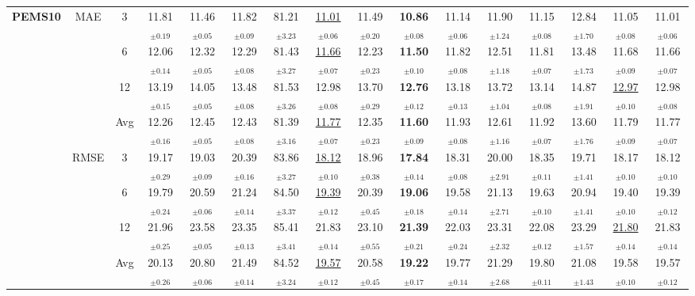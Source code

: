 \begin{table}[t]
{\begin{tabular}{ccc|ccc|cccc|cccc|cc}
\midrule
\multirow{12}{*}{\textbf{PEMS10}} & \multirow{4}{*}{MAE} & 3 & 11.81$_{\pm0.19}$ & 11.46$_{\pm0.05}$ & 11.82$_{\pm0.09}$ & 81.21$_{\pm3.23}$ & \underline{11.01$_{\pm0.06}$} & 11.49$_{\pm0.20}$ & \textbf{10.86$_{\pm0.08}$} & 11.14$_{\pm0.06}$ & 11.90$_{\pm1.24}$ & 11.15$_{\pm0.08}$ & 12.84$_{\pm1.70}$ & 11.05$_{\pm0.08}$ & 11.01$_{\pm0.06}$ \\
 &  & 6 & 12.06$_{\pm0.14}$ & 12.32$_{\pm0.05}$ & 12.29$_{\pm0.08}$ & 81.43$_{\pm3.27}$ & \underline{11.66$_{\pm0.07}$} & 12.23$_{\pm0.23}$ & \textbf{11.50$_{\pm0.10}$} & 11.82$_{\pm0.08}$ & 12.51$_{\pm1.18}$ & 11.81$_{\pm0.07}$ & 13.48$_{\pm1.73}$ & 11.68$_{\pm0.09}$ & 11.66$_{\pm0.07}$ \\
 &  & 12 & 13.19$_{\pm0.15}$ & 14.05$_{\pm0.05}$ & 13.48$_{\pm0.08}$ & 81.53$_{\pm3.26}$ & 12.98$_{\pm0.08}$ & 13.70$_{\pm0.29}$ & \textbf{12.76$_{\pm0.12}$} & 13.18$_{\pm0.13}$ & 13.72$_{\pm1.04}$ & 13.14$_{\pm0.08}$ & 14.87$_{\pm1.91}$ & \underline{12.97$_{\pm0.10}$} & 12.98$_{\pm0.08}$ \\
 &  & Avg & 12.26$_{\pm0.16}$ & 12.45$_{\pm0.05}$ & 12.43$_{\pm0.08}$ & 81.39$_{\pm3.16}$ & \underline{11.77$_{\pm0.07}$} & 12.35$_{\pm0.23}$ & \textbf{11.60$_{\pm0.09}$} & 11.93$_{\pm0.08}$ & 12.61$_{\pm1.16}$ & 11.92$_{\pm0.07}$ & 13.60$_{\pm1.76}$ & 11.79$_{\pm0.09}$ & 11.77$_{\pm0.07}$ \\
\cmidrule(lr){2-16}
 & \multirow{4}{*}{RMSE} & 3 & 19.17$_{\pm0.29}$ & 19.03$_{\pm0.09}$ & 20.39$_{\pm0.16}$ & 83.86$_{\pm3.27}$ & \underline{18.12$_{\pm0.10}$} & 18.96$_{\pm0.38}$ & \textbf{17.84$_{\pm0.14}$} & 18.31$_{\pm0.08}$ & 20.00$_{\pm2.91}$ & 18.35$_{\pm0.11}$ & 19.71$_{\pm1.41}$ & 18.17$_{\pm0.10}$ & 18.12$_{\pm0.10}$ \\
 &  & 6 & 19.79$_{\pm0.24}$ & 20.59$_{\pm0.06}$ & 21.24$_{\pm0.14}$ & 84.50$_{\pm3.37}$ & \underline{19.39$_{\pm0.12}$} & 20.39$_{\pm0.45}$ & \textbf{19.06$_{\pm0.18}$} & 19.58$_{\pm0.14}$ & 21.13$_{\pm2.71}$ & 19.63$_{\pm0.10}$ & 20.94$_{\pm1.41}$ & 19.40$_{\pm0.10}$ & 19.39$_{\pm0.12}$ \\
 &  & 12 & 21.96$_{\pm0.25}$ & 23.58$_{\pm0.05}$ & 23.35$_{\pm0.13}$ & 85.41$_{\pm3.41}$ & 21.83$_{\pm0.14}$ & 23.10$_{\pm0.55}$ & \textbf{21.39$_{\pm0.21}$} & 22.03$_{\pm0.24}$ & 23.31$_{\pm2.32}$ & 22.08$_{\pm0.12}$ & 23.29$_{\pm1.57}$ & \underline{21.80$_{\pm0.14}$} & 21.83$_{\pm0.14}$ \\
 &  & Avg & 20.13$_{\pm0.26}$ & 20.80$_{\pm0.06}$ & 21.49$_{\pm0.14}$ & 84.52$_{\pm3.24}$ & \underline{19.57$_{\pm0.12}$} & 20.58$_{\pm0.45}$ & \textbf{19.22$_{\pm0.17}$} & 19.77$_{\pm0.14}$ & 21.29$_{\pm2.68}$ & 19.80$_{\pm0.11}$ & 21.08$_{\pm1.43}$ & 19.58$_{\pm0.10}$ & 19.57$_{\pm0.12}$ \\

\end{tabular}}
\end{table}
